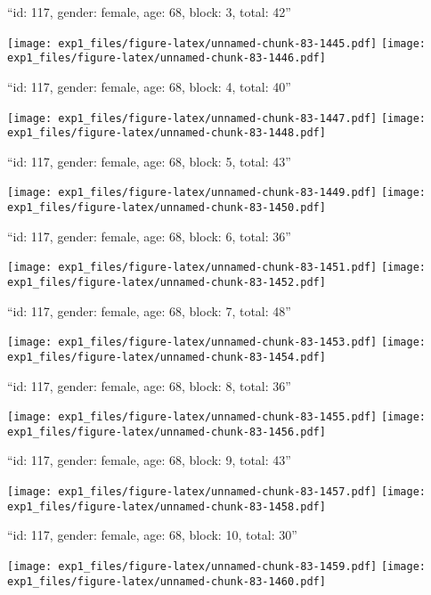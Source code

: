 \documentclass[11pt,,]{article}
\begin{document}
\newpage
[1] 

``id: 117, gender: female, age: 68, block: 3, total: 42''

\texttt{[image: exp1\_files/figure-latex/unnamed-chunk-83-1445.pdf]}
\texttt{[image: exp1\_files/figure-latex/unnamed-chunk-83-1446.pdf]}

\newpage
[1] 

``id: 117, gender: female, age: 68, block: 4, total: 40''

\texttt{[image: exp1\_files/figure-latex/unnamed-chunk-83-1447.pdf]}
\texttt{[image: exp1\_files/figure-latex/unnamed-chunk-83-1448.pdf]}

\newpage
[1] 

``id: 117, gender: female, age: 68, block: 5, total: 43''

\texttt{[image: exp1\_files/figure-latex/unnamed-chunk-83-1449.pdf]}
\texttt{[image: exp1\_files/figure-latex/unnamed-chunk-83-1450.pdf]}

\newpage
[1] 

``id: 117, gender: female, age: 68, block: 6, total: 36''

\texttt{[image: exp1\_files/figure-latex/unnamed-chunk-83-1451.pdf]}
\texttt{[image: exp1\_files/figure-latex/unnamed-chunk-83-1452.pdf]}

\newpage
[1] 

``id: 117, gender: female, age: 68, block: 7, total: 48''

\texttt{[image: exp1\_files/figure-latex/unnamed-chunk-83-1453.pdf]}
\texttt{[image: exp1\_files/figure-latex/unnamed-chunk-83-1454.pdf]}

\newpage
[1] 

``id: 117, gender: female, age: 68, block: 8, total: 36''

\texttt{[image: exp1\_files/figure-latex/unnamed-chunk-83-1455.pdf]}
\texttt{[image: exp1\_files/figure-latex/unnamed-chunk-83-1456.pdf]}

\newpage
[1] 

``id: 117, gender: female, age: 68, block: 9, total: 43''

\texttt{[image: exp1\_files/figure-latex/unnamed-chunk-83-1457.pdf]}
\texttt{[image: exp1\_files/figure-latex/unnamed-chunk-83-1458.pdf]}

\newpage
[1] 

``id: 117, gender: female, age: 68, block: 10, total: 30''

\texttt{[image: exp1\_files/figure-latex/unnamed-chunk-83-1459.pdf]}
\texttt{[image: exp1\_files/figure-latex/unnamed-chunk-83-1460.pdf]}
\end{document}
